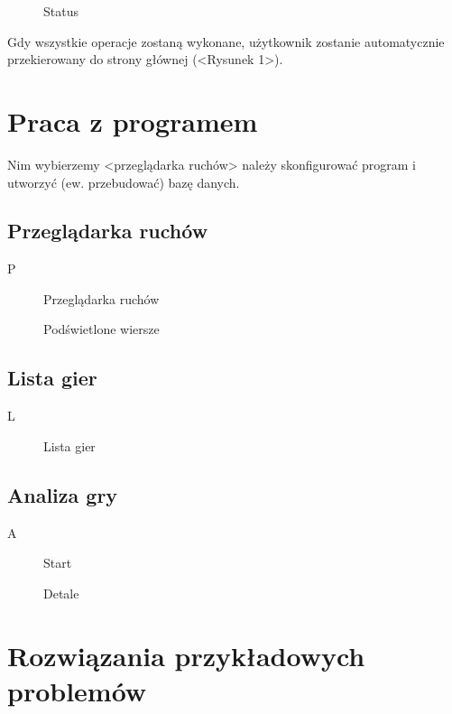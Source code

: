 \documentclass[10pt,leqno]{article}
\newcommand{\myimage}[3]{
  \begin{figure}[h!]
    \centering
      \fbox{\texttt{[image: \#2]}}
  \caption{#3}
  \end{figure}
}
\begin{document}
\myimage{0.4}{status.png}{Status}

Gdy wszystkie operacje zostaną wykonane, użytkownik zostanie automatycznie przekierowany do strony głównej (<Rysunek 1>).

\section{Praca z programem}
Nim wybierzemy <przeglądarka ruchów> należy skonfigurować program i utworzyć (ew. przebudować) bazę danych.

\subsection{Przeglądarka ruchów}
P

\myimage{0.4}{moveBrowserMain.png}{Przeglądarka ruchów}

\myimage{0.4}{moveBrowserMoveOver.png}{Podświetlone wiersze}

\subsection{Lista gier}
L

\myimage{0.4}{gameList.png}{Lista gier}

\subsection{Analiza gry}
A

\myimage{0.4}{gameDetailsMain.png}{Start}

\myimage{0.4}{gameDetails.png}{Detale}

\section{Rozwiązania przykładowych problemów}
\end{document}
